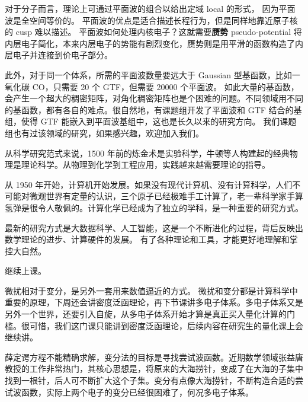对于分子而言，理论上可通过平面波的组合以给出定域 local 的形式，
因为平面波是全空间等价的。
平面波的优点是适合描述长程行为，但是同样地靠近原子核的 cusp 难以描述。
平面波如何处理内核电子？这就需要\textbf{赝势} pseudo-potential 将内层电子简化，本来内层电子的势能有剧烈变化，赝势则是用平滑的函数构造了内层电子并连接到价电子部分。

此外，对于同一个体系，所需的平面波数量要远大于 Gaussian 型基函数，比如一氧化碳 CO，只需要 20 个 GTF，但需要 \num{20000} 个平面波。
如此大量的基函数，会产生一个超大的稠密矩阵，对角化稠密矩阵也是个困难的问题。不同领域用不同的基函数，都有各自的难点。很自然地，有课题组开发了平面波和 GTF 结合的基组，使得 GTF 能嵌入到平面波基组中，这也是长久以来的研究方向。
我们课题组也有过该领域的研究，如果感兴趣，欢迎加入我们。


从科学研究范式来说，1500 年前的炼金术是实验科学，牛顿等人构建起的经典物理是理论科学。从物理到化学到工程应用，实践越来越需要理论的指导。

从 1950 年开始，计算机开始发展。如果没有现代计算机、没有计算科学，人们不可能对微观世界有定量的认识，三个原子已经极难手工计算了，老一辈科学家手算氢弹是很令人敬佩的。计算化学已经成为了独立的学科，是一种重要的研究方式。

最新的研究方式是大数据科学、人工智能，这是一个不断进化的过程，背后反映出数学理论的进步、计算硬件的发展。
有了各种理论和工具，才能更好地理解和掌控大自然。



继续上课。

微扰相对于变分，是另外一套用来数值逼近的方式。
微扰和变分都是计算科学中重要的原理，下周还会讲密度泛函理论，再下节课讲多电子体系。多电子体系又是另外一个世界，还要引入自旋，从多电子体系开始才算是真正买入量化计算的门槛。很可惜，我们这门课只能讲到密度泛函理论，后续内容在研究生的量化课上会继续讲。

薛定谔方程不能精确求解，变分法的目标是寻找尝试波函数。近期数学领域张益唐教授的工作非常热门，其核心思想是，将原来的大海捞针，变成了在大海的子集中找到一根针，后人可不断扩大这个子集。变分有点像大海捞针，不断构造合适的尝试波函数，实际上两个电子的变分已经很困难了，何况多电子体系。



